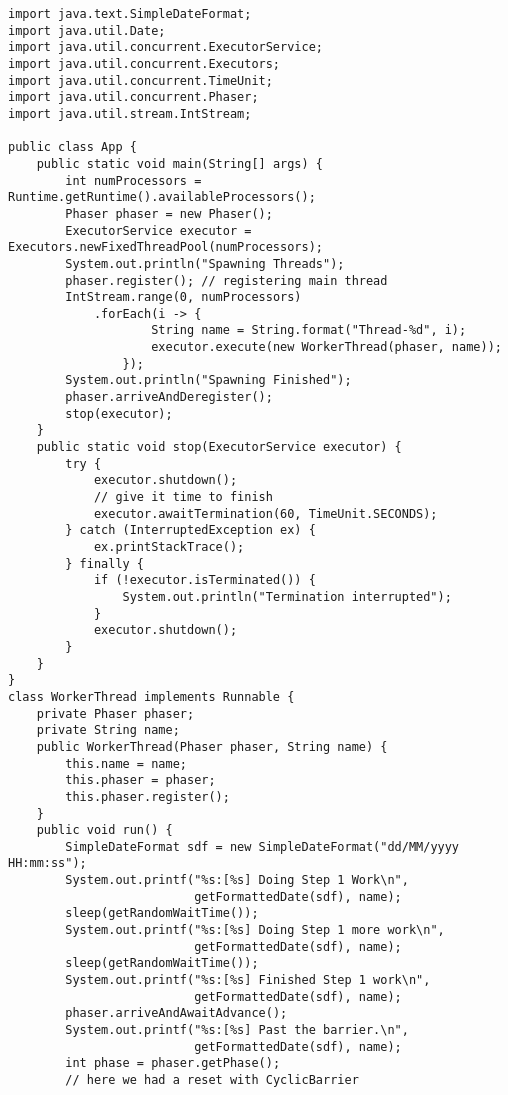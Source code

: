 \documentclass{latex/classes/myarticle}
\begin{document}
\begin{lstlisting}
import java.text.SimpleDateFormat;
import java.util.Date;
import java.util.concurrent.ExecutorService;
import java.util.concurrent.Executors;
import java.util.concurrent.TimeUnit;
import java.util.concurrent.Phaser;
import java.util.stream.IntStream;

public class App {
    public static void main(String[] args) {
        int numProcessors = Runtime.getRuntime().availableProcessors();
        Phaser phaser = new Phaser();
        ExecutorService executor = Executors.newFixedThreadPool(numProcessors);
        System.out.println("Spawning Threads");
        phaser.register(); // registering main thread
        IntStream.range(0, numProcessors)
            .forEach(i -> {
                    String name = String.format("Thread-%d", i);
                    executor.execute(new WorkerThread(phaser, name));
                });
        System.out.println("Spawning Finished");
        phaser.arriveAndDeregister();
        stop(executor);
    }
    public static void stop(ExecutorService executor) {
        try {
            executor.shutdown();
            // give it time to finish
            executor.awaitTermination(60, TimeUnit.SECONDS);
        } catch (InterruptedException ex) {
            ex.printStackTrace();
        } finally {
            if (!executor.isTerminated()) {
                System.out.println("Termination interrupted");
            }
            executor.shutdown();
        }
    }
}
class WorkerThread implements Runnable {
    private Phaser phaser;
    private String name;
    public WorkerThread(Phaser phaser, String name) {
        this.name = name;
        this.phaser = phaser;
        this.phaser.register();
    }
    public void run() {
        SimpleDateFormat sdf = new SimpleDateFormat("dd/MM/yyyy HH:mm:ss");
        System.out.printf("%s:[%s] Doing Step 1 Work\n",
                          getFormattedDate(sdf), name);
        sleep(getRandomWaitTime());
        System.out.printf("%s:[%s] Doing Step 1 more work\n",
                          getFormattedDate(sdf), name);
        sleep(getRandomWaitTime());
        System.out.printf("%s:[%s] Finished Step 1 work\n",
                          getFormattedDate(sdf), name);
        phaser.arriveAndAwaitAdvance();
        System.out.printf("%s:[%s] Past the barrier.\n",
                          getFormattedDate(sdf), name);
        int phase = phaser.getPhase();
        // here we had a reset with CyclicBarrier

\end{lstlisting}
\end{document}

